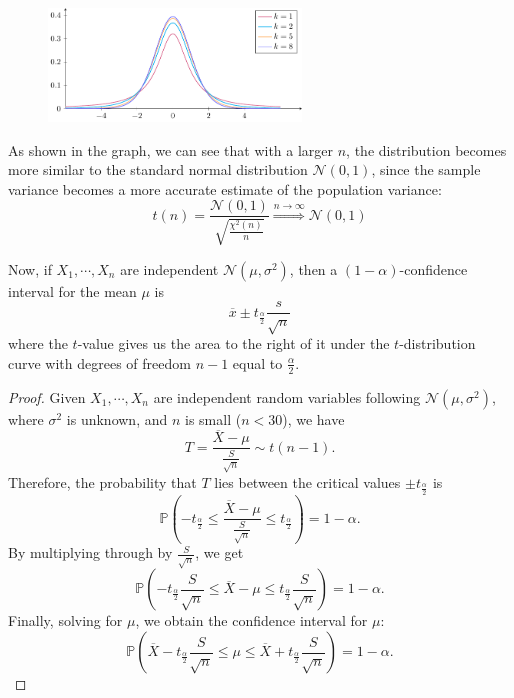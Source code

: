 \begin{figure}[H]
  \centering
  \includegraphics[width=0.6\textwidth]{Figures/t-dis.pdf}
\end{figure}

As shown in the graph, we can see that with a larger \(n\), the distribution becomes more similar to the standard normal distribution \(\mathcal{N}(0, 1)\), since the sample variance becomes a more accurate estimate of the population variance: 
\[
  t(n) = \dfrac{\mathcal{N}(0, 1)}{\sqrt{\frac{\chi^2(n)}{n}}} \overset{n \to \infty}{\Longrightarrow} \mathcal{N} (0, 1)
\]

Now, if \(X_1, \cdots, X_n\) are independent \(\mathcal{N} (\mu, \sigma^2)\), then a \((1 - \alpha)\)-confidence interval for the mean \(\mu\) is  
\[
  \overline{x} \pm t_{\frac{\alpha}{2}}\dfrac{s}{\sqrt{n}}
\]
where the \(t\)-value gives us the area to the right of it under the \(t\)-distribution curve with degrees of freedom \(n - 1\) equal to \(\frac{\alpha}{2}\).

\begin{proof}
  Given \(X_1, \cdots, X_n\) are independent random variables following \(\mathcal{N}(\mu, \sigma^2)\), where \(\sigma^2\) is unknown, and \(n\) is small (\(n < 30\)), we have
  \[
    T = \frac{\overline{X} - \mu}{\frac{S}{\sqrt{n}}} \sim t(n - 1).
  \]
  Therefore, the probability that \(T\) lies between the critical values \( \pm t_{\frac{\alpha}{2}} \) is
  \[
    \mathbb{P}\left(-t_{\frac{\alpha}{2}} \leq \dfrac{\overline{X} - \mu}{\frac{S}{\sqrt{n}}} \leq t_{\frac{\alpha}{2}}\right) = 1 - \alpha.
  \]
  By multiplying through by \(\frac{S}{\sqrt{n}}\), we get
  \[
    \mathbb{P}\left(-t_{\frac{\alpha}{2}}\frac{S}{\sqrt{n}} \leq \overline{X} - \mu \leq t_{\frac{\alpha}{2}}\frac{S}{\sqrt{n}}\right) = 1 - \alpha.
  \]
  Finally, solving for \(\mu\), we obtain the confidence interval for \(\mu\):
  \[
    \mathbb{P}\left(\overline{X} - t_{\frac{\alpha}{2}}\frac{S}{\sqrt{n}} \leq \mu \leq \overline{X} + t_{\frac{\alpha}{2}}\frac{S}{\sqrt{n}}\right) = 1 - \alpha.
  \]
\end{proof}

